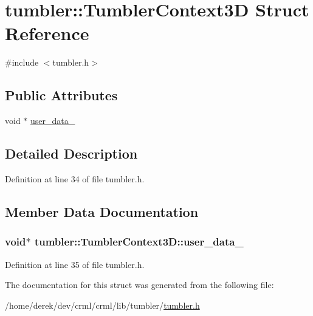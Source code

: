 \hypertarget{structtumbler_1_1_tumbler_context3_d}{
\section{tumbler::TumblerContext3D Struct Reference}
\label{structtumbler_1_1_tumbler_context3_d}
}


{\ttfamily \#include $<$tumbler.h$>$}

\subsection*{Public Attributes}
\begin{DoxyCompactItemize}
\item 
void $\ast$ \hyperlink{structtumbler_1_1_tumbler_context3_d_a1274a5b24b002c4e264bc7ee9298e85d}{user\_\-data\_\-}
\end{DoxyCompactItemize}


\subsection{Detailed Description}


Definition at line 34 of file tumbler.h.



\subsection{Member Data Documentation}
\hypertarget{structtumbler_1_1_tumbler_context3_d_a1274a5b24b002c4e264bc7ee9298e85d}{
\subsubsection[{user\_\-data\_\-}]{\setlength{\rightskip}{0pt plus 5cm}void$\ast$ {\bf tumbler::TumblerContext3D::user\_\-data\_\-}}}
\label{structtumbler_1_1_tumbler_context3_d_a1274a5b24b002c4e264bc7ee9298e85d}


Definition at line 35 of file tumbler.h.



The documentation for this struct was generated from the following file:\begin{DoxyCompactItemize}
\item 
/home/derek/dev/crml/crml/lib/tumbler/\hyperlink{tumbler_8h}{tumbler.h}\end{DoxyCompactItemize}
